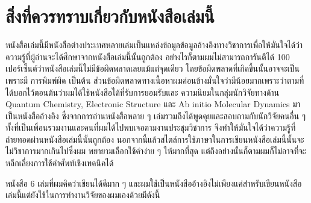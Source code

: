 

{

\chapter*{\centering สิ่งที่ควรทราบเกี่ยวกับหนังสือเล่มนี้}

หนังสือเล่มนี้มีหนังสือต่างประเทศหลายเล่มเป็นแหล่งข้อมูลข้อมูลอ้างอิงทางวิชาการเพื่อให้มั่นใจได้ว่าความรู้ที่ผู้อ่านจะได้ศึกษาจากหนังสือเล่มนี้นั้นถูกต้อง
อย่างไรก็ตามผมไม่สามารถการันตีได้ 100 เปอร์เซ็นต์ว่าหนังสือเล่มนี้ไม่มีข้อผิดพลาดเลยแม้แต่จุดเดียว โดยข้อผิดพลาดที่เกิดขึ้นนั้นอาจจะเป็นเพราะมี%
การพิมพ์ผิด เป็นต้น ส่วนข้อผิดพลาดทางเนื้อหาผมค่อนข้างมั่นใจว่ามีน้อยมากเพราะว่าตามที่ได้บอกไว้ตอนต้นว่าผมได้ใช้หนังสือได้ที่รับการยอมรับและ%
ความนิยมในกลุ่มนักวิจัยทางด้าน Quantum Chemistry, Electronic Structure และ Ab initio Molecular Dynamics มาเป็นหนังสืออ้างอิง 
ซึ่งจากการอ่านหนังสือหลาย ๆ เล่มรวมถึงได้พูดคุยและสอบถามกับนักวิจัยคนอื่น ๆ ทั้งที่เป็นเพื่อนรวมงานและคนที่ผมได้ไปพบเจอตามงานประชุมวิชาการ%
จึงทำให้มั่นใจได้ว่าความรู้ที่ถ่ายทอดผ่านหนังสือเล่มนี้นั้นถูกต้อง นอกจากนี้แล้วสไตล์การใช้ภาษาในการเขียนหนังสือเล่มนี้นั้นจะไม่วิชาการมากเกินไปซึ่งผม%
พยายามเลือกใช้คำง่าย ๆ ให้มากที่สุด แต่ถึงอย่างนั้นก็ตามผมก็ไม่อาจที่จะหลีกเลี่ยงการใช้คำศัพท์เชิงเทคนิคได้

หนังสือ 6 เล่มที่ผมคิดว่าเขียนได้ดีมาก ๆ และผมใช้เป็นหนังสืออ้างอิงไม่เพียงแค่สำหรับเขียนหนังสือเล่มนี้แต่ยังใช้ในการทำงานวิจัยของผมเองด้วยมีดังนี้

}

